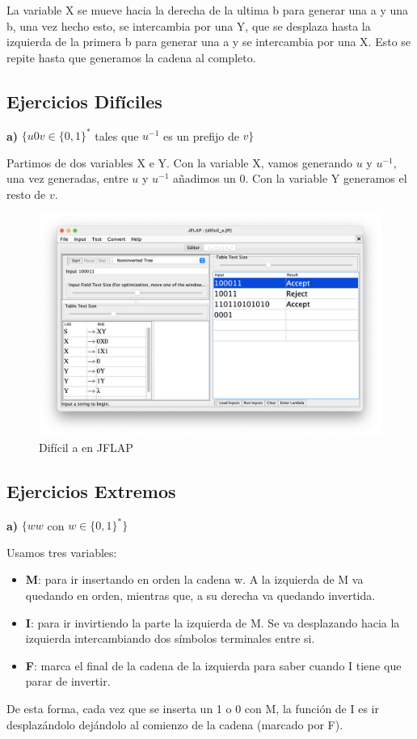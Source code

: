 La variable X se mueve hacia la derecha de la ultima b para generar una a y una b, una vez hecho esto, se intercambia por una Y, que se desplaza hasta la izquierda de la primera
b para generar una a y se intercambia por una X. Esto se repite hasta que generamos la cadena al completo.

\subsection{Ejercicios Difíciles}

\textbf{a)}  $\{ u0v \in \{0,1\}^{\ast} $ tales que $u^{-1}$ es un prefijo de $v\}$

Partimos de dos variables X e Y. Con la variable X, vamos generando $u$ y $u^{-1}$, una vez generadas, entre $u$ y $u^{-1}$ añadimos un 0. Con la variable Y generamos el resto de $v$.


\begin{figure}[H] 
	\centering
	\includegraphics[scale=0.35]{../practica_1/images/dificil_a.png} 
	\caption{Difícil a en JFLAP} 
    \label{fig:dificil_a}
\end{figure}

\subsection{Ejercicios Extremos}

\textbf{a)}  $\{ ww$ con $w \in \{0,1\}^{\ast}\}$

Usamos tres variables:
\begin{itemize}
\item \textbf{M}: para ir insertando en orden la cadena w. A la izquierda de M va quedando en orden, mientras que, a su derecha va quedando invertida.
\item \textbf{I}: para ir invirtiendo la parte la izquierda de M. Se va desplazando hacia la izquierda intercambiando dos símbolos terminales entre si.
\item \textbf{F}: marca el final de la cadena de la izquierda para saber cuando I tiene que parar de invertir. 
\end{itemize}
De esta forma, cada vez que se inserta un 1 o 0 con M, la función de I es ir desplazándolo dejándolo al comienzo de la cadena (marcado por F).

